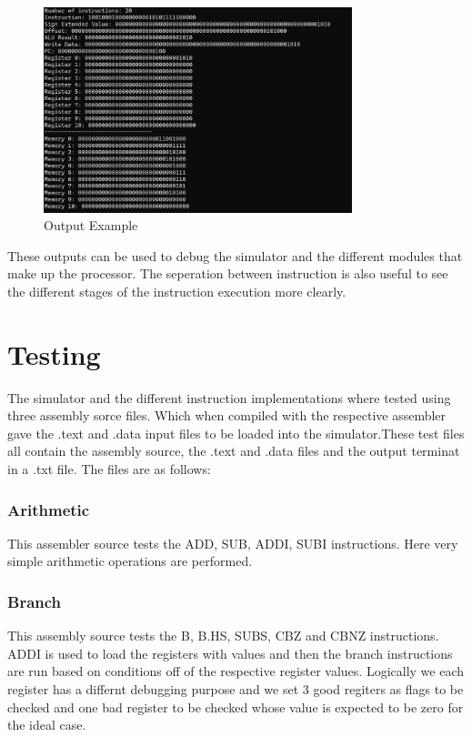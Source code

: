 \documentclass{article}
\begin{document}
\begin{figure}[htbp]
    \centering
    \includegraphics[width=0.8\textwidth]{screen_dumps/example_output.png}
    \caption{Output Example}
    \label{fig:7}
\end{figure}

These outputs can be used to debug the simulator and the different modules that make up the processor. The seperation between instruction is also useful to see the different stages of the instruction execution more clearly.\\

\section{Testing}
The simulator and the different instruction implementations where tested using three assembly sorce files. Which when compiled with the respective assembler gave the .text and .data input files to be loaded into the simulator.These test files all contain the assembly source, the .text and .data files and the output terminat in a .txt file. The files are as follows:\\

\subsubsection{Arithmetic}
This assembler source tests the ADD, SUB, ADDI, SUBI instructions. Here very simple arithmetic operations are performed.\\

\subsubsection{Branch}
This assembly source tests the B, B.HS, SUBS, CBZ and CBNZ instructions. ADDI is used to load the registers with values and then the branch instructions are run based on conditions off of the respective register values. Logically we each register has a differnt debugging purpose and we set 3 good regiters as flags to be checked and one bad register to be checked whose value is expected to be zero for the ideal case.\\
\end{document}
